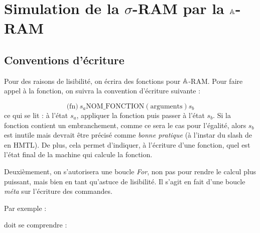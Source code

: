 	
	
	

	\begin{appendices}
		\label{appendices}
		
		
		
		\chapter{Simulation de la $\sigma$-RAM par la $\mathbb{A}$-RAM}
			\label{sec:annexes_programmes}
			
			\section{Conventions d'écriture}
			\label{subsec:conventions_ecriture}
			Pour des raisons de lisibilité, on écrira des fonctions pour $\mathbb{A}$-RAM. Pour faire appel à la fonction, on suivra la convention d'écriture suivante : 
			
			\[
				\text{(fn)} \ s_a \text{NOM\_FONCTION} (\text{arguments})s_b
			\]
			ce qui se lit : à l'état $s_a$, appliquer la fonction puis passer à l'état $s_b$. Si la fonction contient un embranchement, comme ce sera le cas pour l'égalité, alors $s_b$ est inutile mais devrait être précisé comme \emph{bonne pratique} (à l'instar du slash de  en HMTL). De plus, cela permet d'indiquer, à l'écriture d'une fonction, quel est l'état final de la machine qui calcule la fonction.
			
			Deuxièmement, on s'autorisera une boucle \emph{For}, non pas pour rendre le calcul plus puissant, mais bien en tant qu'astuce de lisibilité. Il s'agit en fait d'une boucle \emph{méta} sur l'écriture des commandes.
			
			Par exemple :
			
			\espace
			
			\begin{algorithm}[H]
			\end{algorithm}
			
			\espace
			
			doit se comprendre :
			

\end{appendices}
